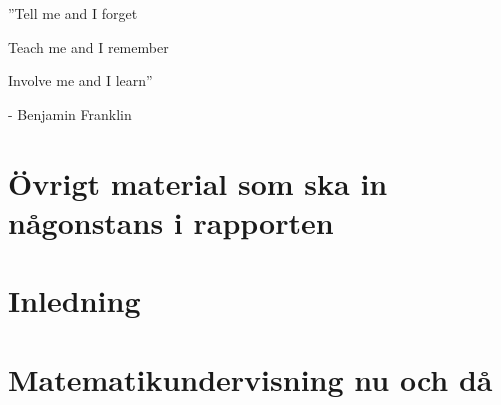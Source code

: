 \documentclass[11pt,a4paper]{article}
\begin{document}



\newpage

\begin{centering}
\Huge
''Tell me and I forget 

Teach me and I remember

Involve me and I learn''

\end{centering}
\bigskip
\begin{centering}

\Large
- Benjamin Franklin

\end{centering}
\newpage

\renewcommand\abstractname{Sammandrag}\begin{abstract}

\end{abstract}

\newpage

\renewcommand\abstractname{Abstract}
\begin{abstract} 

\end{abstract}

\newpage
 
\tableofcontents

\newpage
{}

\section*{Övrigt material som ska in någonstans i rapporten}
    

\section{Inledning}
    

\section{Matematikundervisning nu och då}
    
    \label{sec:Bakgrund}
    
    
\end{document}
